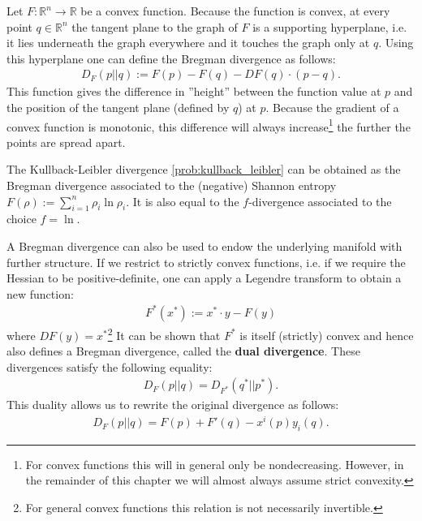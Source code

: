     \begin{definition}
        Let $F:\mathbb{R}^n\rightarrow\mathbb{R}$ be a convex function. Because the function is convex, at every point $q\in\mathbb{R}^n$ the tangent plane to the graph of $F$ is a supporting hyperplane, i.e. it lies underneath the graph everywhere and it touches the graph only at $q$. Using this hyperplane one can define the Bregman divergence as follows:
        \begin{gather}
            D_F(p||q) := F(p) - F(q) - DF(q)\cdot(p-q).
        \end{gather}
        This function gives the difference in ''height'' between the function value at $p$ and the position of the tangent plane (defined by $q$) at $p$. Because the gradient of a convex function is monotonic, this difference will always increase\footnote{For convex functions this will in general only be nondecreasing. However, in the remainder of this chapter we will almost always assume strict convexity.} the further the points are spread apart.
    \end{definition}
    \begin{example}
        The Kullback-Leibler divergence \ref{prob:kullback_leibler} can be obtained as the Bregman divergence associated to the (negative) Shannon entropy $F(\rho) := \sum_{i=1}^n\rho_i\ln\rho_i$. It is also equal to the $f$-divergence associated to the choice $f=\ln$.
    \end{example}

    A Bregman divergence can also be used to endow the underlying manifold with further structure. If we restrict to strictly convex functions, i.e. if we require the Hessian to be positive-definite, one can apply a Legendre transform to obtain a new function:
    \begin{gather}
        F^*(x^*) := x^*\cdot y - F(y)
    \end{gather}
    where $DF(y)=x^*$\footnote{For general convex functions this relation is not necessarily invertible.} It can be shown that $F^*$ is itself (strictly) convex and hence also defines a Bregman divergence, called the \textbf{dual divergence}. These divergences satisfy the following equality:
    \begin{gather}
        D_F(p||q) = D_{F^*}(q^*||p^*).
    \end{gather}
    This duality allows us to rewrite the original divergence as follows:
    \begin{gather}
        D_F(p||q) = F(p) + F'(q) - x^i(p)y_i(q).
    \end{gather}

